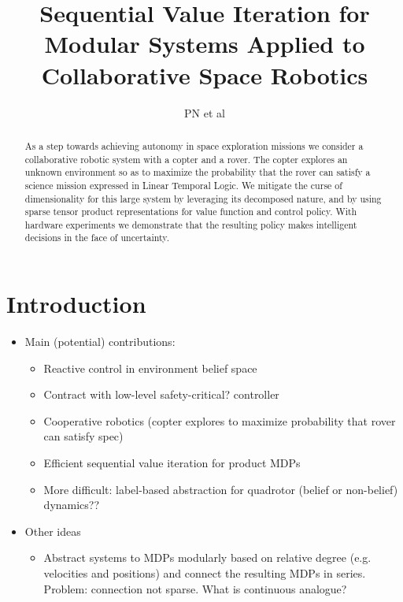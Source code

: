 \documentclass[conference]{IEEEtran}
\begin{document}
\title{\huge Sequential Value Iteration for Modular Systems Applied to Collaborative Space Robotics}

\author{PN et al}

\maketitle

\begin{abstract}
  As a step towards achieving autonomy in space exploration missions we consider a collaborative robotic system with a copter and a rover. The copter explores an unknown environment so as to maximize the probability that the rover can satisfy a science mission expressed in Linear Temporal Logic. We mitigate the curse of dimensionality for this large system by leveraging its decomposed nature, and by using sparse tensor product representations for value function and control policy. With hardware experiments we demonstrate that the resulting policy makes intelligent decisions in the face of uncertainty.
\end{abstract}

\IEEEpeerreviewmaketitle

	

\section{Introduction}

\begin{itemize}
  \item Main (potential) contributions:
  \begin{itemize}
    \item Reactive control in environment belief space
    \item Contract with low-level safety-critical? controller
    \item Cooperative robotics (copter explores to maximize probability that rover can satisfy spec)
    \item Efficient sequential value iteration for product MDPs
    \item More difficult: label-based abstraction for quadrotor (belief or non-belief) dynamics?? 
  \end{itemize}
  \item Other ideas
  \begin{itemize}
  	\item Abstract systems to MDPs modularly based on relative degree (e.g. velocities and positions) and connect the resulting MDPs in series. Problem: connection not sparse. What is continuous analogue?
  \end{itemize}
\end{itemize}
\end{document}
